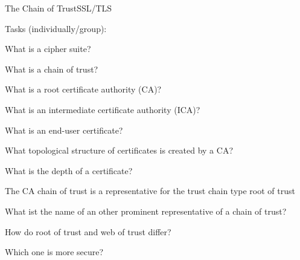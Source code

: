 ﻿\begin{frame}{The \alert{Chain of Trust}}{SSL/TLS}
\begin{exampleblock}{Tasks (individually/group):}
    \begin{description}[???]
        \item [???] What is a \alert{cipher suite}?
        \item [???] What is a \alert{chain of trust}?
        \item [???] What is a \alert{root certificate authority (CA)}?
        \item [???] What is an \alert{intermediate certificate authority (ICA)}?
        \item [???] What is an \alert{end-user} certificate?
        \item [???] What \alert{topological structure} of \alert{certificates} is created by a \alert{CA}?
        \item [???] What is the \alert{depth} of a certificate?
        \item [???] The \alert{CA chain of trust} is a representative for the trust chain type \alert{root of trust}
        \begin{description}[???]
            \item [???] What ist the name of an other \alert{prominent representative} of a chain of trust?
            \item [???] How do \alert{root of trust} and \alert{web of trust} differ?
            \item [???] Which one is \alert{more secure}?
        \end{description}
    \end{description}
\end{exampleblock}
\end{frame}
